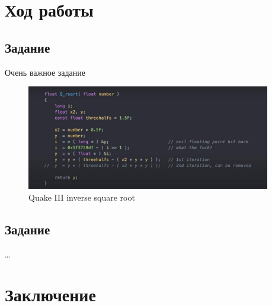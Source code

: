 \documentclass[fontsize=14pt, paper=a4, pagesize, DIV=calc]{scrreprt}
\begin{document}

\chapter{Ход работы}

\section{Задание }

Очень важное задание

\begin{figure}[H]
  \centering
  \includegraphics[interpolate, width=0.95\textwidth]{Q_rsqrt}
  \caption{Quake III inverse square root}
  \label{fig:rsqrt}
\end{figure}

\section {Задание }

\lipsum[1-2]\ldots

\chapter{Заключение}

\lipsum[3-4]

\nocite{*} %
\printbibliography[
  heading=bibintoc,
  title={СПИСОК ИСПОЛЬЗОВАННЫХ ИСТОЧНИКОВ},
]
\end{document}
